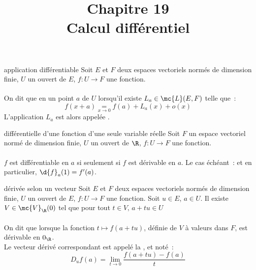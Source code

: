 

\setcounter{chapitre}{19}

\title{\Large Chapitre 19 \\ \Huge Calcul différentiel}



\maketitle

\begin{definition}{19.1}{application différentiable}
    Soit $E$ et $F$ deux espaces vectoriels normés de dimension finie, $U$ un ouvert de $E$, $f:U\to F$ une fonction.\\\\
    On dit que  en un point $a$ de $U$ lorsqu'il existe $L_a \in \mc{L}(E,F)$ telle que~:
    $$f(x+a) \underset{x \to 0}{=} f(a) + L_a(x) + o(x)$$
    L'application $L_a$ est alors appelée .
\end{definition}

\begin{proposition}{19.7}{différentielle d'une fonction d'une seule variable réelle}
    Soit $F$ un espace vectoriel normé de dimension finie, $U$ un ouvert de $\R$, $f:U\to F$ une fonction.\\\\
    $f$ est différentiable en $a$ si seulement si $f$ est dérivable en $a$. Le cas échéant~:
    et en particulier, $\d{f}_a(1) = f'(a)$.
\end{proposition}

\begin{definition}{19.8}{dérivée selon un vecteur}
    Soit $E$ et $F$ deux espaces vectoriels normés de dimension finie, $U$ un ouvert de $E$, $f:U\to F$ une fonction. Soit $u \in E$, $a \in U$. Il existe $V \in \mc{V}_\R(0)$ tel que pour tout $t \in V,\, a+tu \in U$\\\\
    On dit que  lorsque la fonction $t \mapsto f(a + tu)$, définie de $V$ à valeurs dans $F$, est dérivable en $0_\R$. \\
    Le vecteur dérivé correspondant est appelé la , et noté~:
    $$D_uf(a) = \lim_{t \to 0} \frac{f(a+tu)-f(a)}{t}$$
\end{definition}

